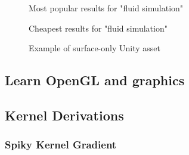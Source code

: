 \documentclass[12pt]{article}
\newcommand{\wideimage}[2][]{%
  \makebox[\textwidth][c]{\texttt{[image: \#2]}}%
}
\begin{document}
    \begin{figure}[H]
        \wideimage[]{unityStore1.png}
        \caption{Most popular results for "fluid simulation" \cite{unityasset}}
    \end{figure}

    \begin{figure}[H]
        \wideimage[]{unityStore2.png}
        \caption{Cheapest results for "fluid simulation" \cite{unityasset}}
    \end{figure}

    \begin{figure}[H]
        \wideimage[]{stylizedWaterURP.png}
        \caption{Example of surface-only Unity asset \cite{stylized}}
    \end{figure}

    \subsection{Learn OpenGL and graphics}

    \subsection{Kernel Derivations}

    \subsubsection{Spiky Kernel Gradient}
\end{document}
